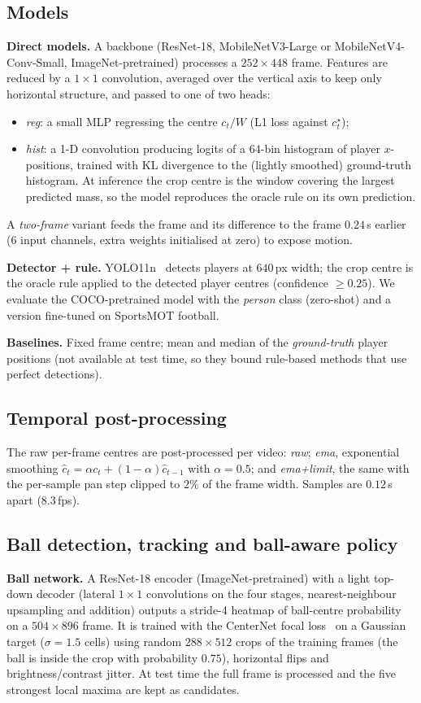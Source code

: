 \documentclass[conference]{IEEEtran}
\begin{document}
\subsection{Models}
\textbf{Direct models.} A backbone (ResNet-18, MobileNetV3-Large or MobileNetV4-Conv-Small, ImageNet-pretrained) processes a $252\times448$ frame. Features are reduced by a $1{\times}1$ convolution, averaged over the vertical axis to keep only horizontal structure, and passed to one of two heads:
\begin{itemize}
\item \emph{reg}: a small MLP regressing the centre $c_t/W$ (L1 loss against $c^\star_t$);
\item \emph{hist}: a 1-D convolution producing logits of a 64-bin histogram of player $x$-positions, trained with KL divergence to the (lightly smoothed) ground-truth histogram. At inference the crop centre is the window covering the largest predicted mass, so the model reproduces the oracle rule on its own prediction.
\end{itemize}
A \emph{two-frame} variant feeds the frame and its difference to the frame $0.24$\,s earlier (6 input channels, extra weights initialised at zero) to expose motion.

\textbf{Detector + rule.} YOLO11n~\cite{yolo11} detects players at $640$\,px width; the crop centre is the oracle rule applied to the detected player centres (confidence $\ge0.25$). We evaluate the COCO-pretrained model with the \emph{person} class (zero-shot) and a version fine-tuned on SportsMOT football.

\textbf{Baselines.} Fixed frame centre; mean and median of the \emph{ground-truth} player positions (not available at test time, so they bound rule-based methods that use perfect detections).

\subsection{Temporal post-processing}
The raw per-frame centres are post-processed per video: \emph{raw}; \emph{ema}, exponential smoothing $\hat c_t=\alpha c_t+(1-\alpha)\hat c_{t-1}$ with $\alpha=0.5$; and \emph{ema+limit}, the same with the per-sample pan step clipped to $2\%$ of the frame width. Samples are $0.12$\,s apart (8.3\,fps).

\subsection{Ball detection, tracking and ball-aware policy}
\textbf{Ball network.} A ResNet-18 encoder (ImageNet-pretrained) with a light top-down decoder (lateral $1{\times}1$ convolutions on the four stages, nearest-neighbour upsampling and addition) outputs a stride-4 heatmap of ball-centre probability on a $504{\times}896$ frame. It is trained with the CenterNet focal loss~\cite{zhou2019} on a Gaussian target ($\sigma=1.5$ cells) using random $288{\times}512$ crops of the training frames (the ball is inside the crop with probability $0.75$), horizontal flips and brightness/contrast jitter. At test time the full frame is processed and the five strongest local maxima are kept as candidates.
\end{document}
